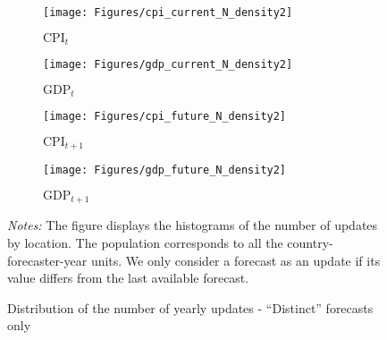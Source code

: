 
\begin{figure}[H]
	
	\begin{subfigure}[b]{0.48\textwidth}
		\centering
		\texttt{[image: Figures/cpi\_current\_N\_density2]}
		\caption{$\text{CPI}_t$ }
		\label{fig:cpi_current_N_density2}
	\end{subfigure}
	\hfill
	\begin{subfigure}[b]{0.48\textwidth}
		\centering
		\texttt{[image: Figures/gdp\_current\_N\_density2]}
		\caption{$\text{GDP}_t$}
		\label{fig:gdp_current_N_density2}
	\end{subfigure}
	
		\begin{subfigure}[b]{0.48\textwidth}
		\centering
		\texttt{[image: Figures/cpi\_future\_N\_density2]}
		\caption{$\text{CPI}_{t+1}$}
		\label{fig:cpi_future_N_density2}
	\end{subfigure}
	\hfill
	\begin{subfigure}[b]{0.48\textwidth}
		\centering
		\texttt{[image: Figures/gdp\_future\_N\_density2]}
		\caption{$\text{GDP}_{t+1}$}
		\label{fig:gdp_future_N_density2}
	\end{subfigure}
	
	\caption{Distribution of the number of yearly updates - ``Distinct'' forecasts only}
	\label{app:fig:hist_update2}
	\begin{fignote}
		\textit{Notes:} The figure displays the histograms of the number of updates by location. The population corresponds to all the country-forecaster-year units. We only consider a forecast as an update if its value differs from the last available forecast.
	\end{fignote}
\end{figure}

